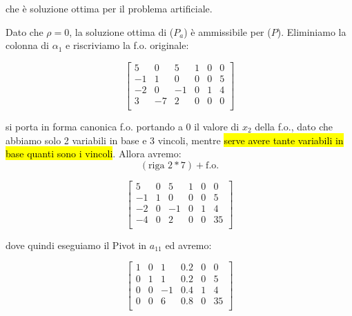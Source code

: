 che è soluzione ottima per il problema artificiale.

Dato che $\rho = 0$, la soluzione ottima di ($P_a$) è ammissibile per ($P$). Eliminiamo la colonna di $\alpha_1$ e riscriviamo la f.o. originale:

$$
\left[ {\begin{array}{cccccc}
	5 & 0 & 5 & 1 & 0 & 0\\
	-1 & 1 & 0 & 0 & 0 & 5\\
	-2 & 0 & -1 & 0 & 1 & 4\\
	3 & -7 & 2 & 0 & 0 & 0\\
\end{array} } \right]
$$

si porta in forma canonica f.o. portando a $0$ il valore di $x_2$ della f.o., dato che abbiamo solo 2 variabili in base e 3 vincoli, mentre \hl{serve avere tante variabili in base quanti sono i vincoli}. Allora avremo:
$$(\text{riga 2} * 7) + \text{f.o.}$$

$$
\left[ {\begin{array}{cccccc}
	5 & 0 & 5 & 1 & 0 & 0\\
	-1 & 1 & 0 & 0 & 0 & 5\\
	-2 & 0 & -1 & 0 & 1 & 4\\
	-4 & 0 & 2 & 0 & 0 & 35\\
\end{array} } \right]
$$

dove quindi eseguiamo il Pivot in $a_{11}$ ed avremo:

$$
\left[ {\begin{array}{cccccc}
	1 & 0 & 1 & 0.2 & 0 & 0\\
	0 & 1 & 1 & 0.2 & 0 & 5\\
	0 & 0 & -1 & 0.4 & 1 & 4\\
	0 & 0 & 6 & 0.8 & 0 & 35\\
\end{array} } \right]
$$